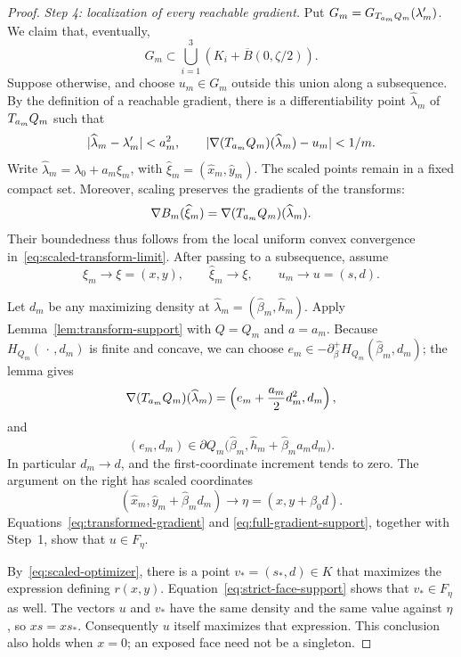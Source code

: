 \begin{proof}
\smallskip
\noindent\textit{Step 4: localization of every reachable gradient.}
Put $G_m=G_{T_{a_m}Q_m}(\lambda'_m)$. We claim that, eventually,
\begin{equation}
 G_m\subset\bigcup_{i=1}^3
                  \left(K_i+\overline B(0,\zeta/2)\right).
 \label{eq:reachable-localization}
\end{equation}
Suppose otherwise, and choose $u_m\in G_m$ outside this union along a
subsequence. By the definition of a reachable gradient, there is a
differentiability point $\widehat\lambda_m$ of $T_{a_m}Q_m$ such that
\[
 |\widehat\lambda_m-\lambda'_m|<a_m^2,
 \qquad
 |\nabla(T_{a_m}Q_m)(\widehat\lambda_m)-u_m|<1/m.
\]
Write $\widehat\lambda_m=\lambda_0+a_m\widehat\xi_m$, with
$\widehat\xi_m=(\widehat x_m,\widehat y_m)$.
The scaled points remain in a fixed compact set. Moreover, scaling
preserves the gradients of the transforms:
\[
 \nabla B_m(\widehat\xi_m)
       =\nabla(T_{a_m}Q_m)(\widehat\lambda_m).
\]
Their boundedness thus follows from the local uniform convex convergence
in~\eqref{eq:scaled-transform-limit}. After passing to a subsequence,
assume
\[
 \xi_m\to\xi=(x,y),\qquad
 \widehat\xi_m\to\xi,\qquad u_m\to u=(s,d).
\]

Let $d_m$ be any maximizing density at
$\widehat\lambda_m=(\widehat\beta_m,\widehat h_m)$. Apply
Lemma~\ref{lem:transform-support} with $Q=Q_m$ and $a=a_m$.
Because $H_{Q_m}(\,\cdot\,,d_m)$ is finite and concave, we can choose
$e_m\in-\partial_\beta^+H_{Q_m}(\widehat\beta_m,d_m)$; the lemma gives
\begin{equation}
 \nabla(T_{a_m}Q_m)(\widehat\lambda_m)
       =\left(e_m+\frac{a_m}{2}d_m^2,d_m\right),
 \label{eq:transformed-gradient}
\end{equation}
and
\begin{equation}
 (e_m,d_m)\in
 \partial Q_m\bigl(\widehat\beta_m,
                   \widehat h_m+\widehat\beta_m a_md_m\bigr).
 \label{eq:full-gradient-support}
\end{equation}
In particular $d_m\to d$, and the first-coordinate increment tends to zero.
The argument on the right has scaled coordinates
\[
 \left(\widehat x_m,
       \widehat y_m+\widehat\beta_m d_m\right)
   \longrightarrow\eta=(x,y+\beta_0d).
\]
Equations~\eqref{eq:transformed-gradient} and
\eqref{eq:full-gradient-support}, together with Step~1, show that
$u\in F_\eta$.

By~\eqref{eq:scaled-optimizer}, there is a point
$v_*=(s_*,d)\in K$ that maximizes the expression defining $r(x,y)$.
Equation~\eqref{eq:strict-face-support} shows that $v_*\in F_\eta$ as
well. The vectors $u$ and $v_*$ have the same density and the same value
against $\eta$, so $xs=xs_*$. Consequently $u$ itself maximizes that
expression. This conclusion also holds when $x=0$; an exposed face need
not be a singleton.


\end{proof}
